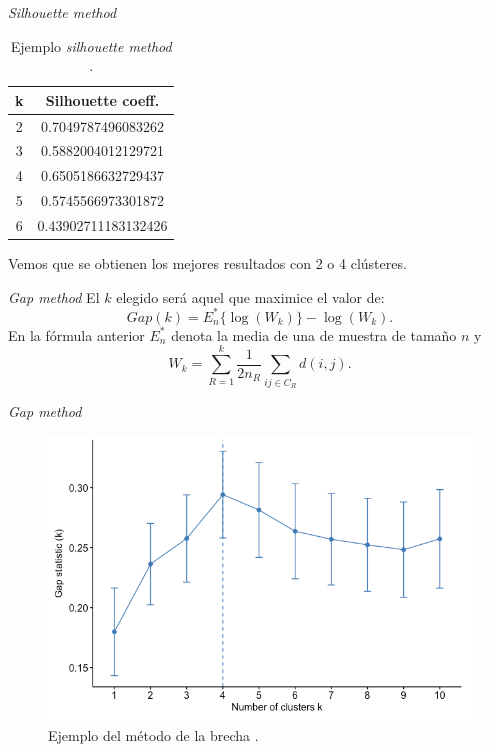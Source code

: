 \documentclass[spanish]{beamer}
\begin{document}
\begin{frame}{\textit{Silhouette method}}
	\begin{table}[h!]
		\centering
		\begin{tabular}{cc} 
			\hline
			k & Silhouette coeff. \\
			\hline
			2 &  0.7049787496083262 \\			 
			3 & 0.5882004012129721 \\	
			4 &  0.6505186632729437 \\
			5 &  0.5745566973301872 \\
			6 & 0.43902711183132426 \\
			\hline
		\end{tabular}
		\caption{Ejemplo \textit{silhouette method} \cite{silouetteGraph}.}
	\end{table}
	Vemos que se obtienen los mejores resultados con 2 o 4 clústeres.
\end{frame}

\begin{frame}{\textit{Gap method}}
	El $ k $ elegido será aquel que maximice el valor de:
	\[
	Gap(k) = E^*_n\{ \log(W_k)\} - \log(W_k).
	\]
	En la fórmula anterior $ E^*_n $ denota la media de una de muestra de tamaño $ n $ y 
	\[
	W_k = \sum_{R = 1}^{k}\frac{1}{2 n_R}\sum_{i j \in C_R} d(i,j).
	\]
\end{frame}

\begin{frame}{\textit{Gap method}}
	\begin{figure}[H]
		\centering
		\includegraphics[scale=0.32]{pedro/gapGraph}
		\caption{Ejemplo del método de la brecha \cite{gapGraph}.}
	\end{figure}
\end{frame}
\end{document}
